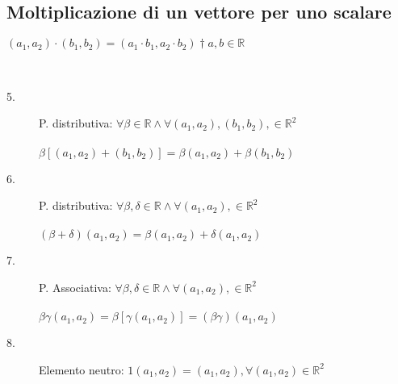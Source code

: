 \newpage

\subsection{Moltiplicazione di un vettore per uno scalare}

\begin{definizione}
	$(a_{1}, a_{2})\cdot(b_{1},b_{2})=(a_{1}\cdot b_{1}, a_{2}\cdot b_{2})\dagger a,b\in \mathbb{R}$
\end{definizione}

\begin{nota}
	\phantom{}\\
	\begin{description}
		\item[5.] P. distributiva: $\forall \beta\in \mathbb{R} \wedge \forall (a_{1}, a_{2}),(b_{1}, b_{2}), \in \mathbb{R}^{2}$\\\\
		\phantom{texttexttextt}$\beta[(a_{1}, a_{2})+(b_{1}, b_{2})]=\beta(a_{1}, a_{2})+\beta(b_{1}, b_{2})$\\
		\item[6.] P. distributiva: $\forall \beta,\delta\in \mathbb{R} \wedge \forall (a_{1}, a_{2}), \in \mathbb{R}^{2}$\\\\
		\phantom{texttexttextt}$(\beta+\delta)(a_{1}, a_{2})=\beta(a_{1}, a_{2})+\delta(a_{1}, a_{2})$\\
		\item[7.] P. Associativa: $\forall \beta,\delta\in \mathbb{R} \wedge \forall (a_{1}, a_{2}), \in \mathbb{R}^{2}$\\\\
		\phantom{texttexttextt}$\beta\gamma(a_{1}, a_{2})=\beta[\gamma(a_{1}, a_{2})]=(\beta\gamma)(a_{1}, a_{2})$\\
		\item[8.] Elemento neutro: $1(a_{1}, a_{2})=(a_{1}, a_{2}), \forall(a_{1}, a_{2})\in\mathbb{R}^{2}$
	\end{description}
\end{nota}







